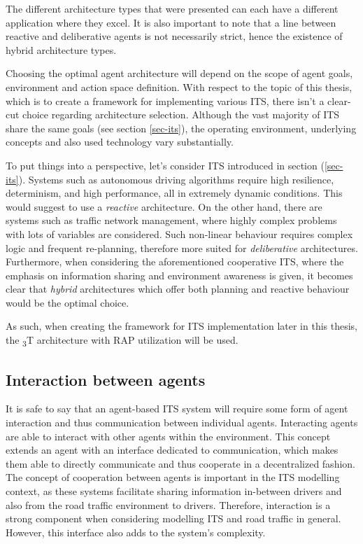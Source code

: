 \documentclass[main.tex]{subfiles}
\begin{document}
The different architecture types that were presented can each have a different application where 
they excel. It is also important to note that a line between reactive and deliberative agents 
is not necessarily strict, hence the existence of hybrid architecture types. 

Choosing the optimal agent architecture will depend on the scope of agent goals, 
environment and action space definition. With respect to the topic of this thesis, which is to 
create a framework for implementing various ITS, there isn't a clear-cut choice regarding 
architecture selection. Although the vast majority of ITS share the same goals (see section \ref{sec-its}), 
the operating environment, underlying concepts and also used technology vary substantially.

To put things into a perspective, let's consider ITS introduced in section (\ref{sec-its}). 
Systems such as autonomous driving algorithms require high resilience, determinism, 
and high performance, all in extremely dynamic conditions. This would suggest to use a
\emph{reactive} architecture. On the other hand, there are systems such as traffic network management, 
where highly complex problems with lots of variables are considered. Such non-linear behaviour 
requires complex logic and frequent re-planning, therefore more suited for \emph{deliberative}
architectures. Furthermore, when considering the aforementioned cooperative ITS, where the emphasis 
on information sharing and environment awareness is given, it becomes clear that \emph{hybrid} 
architectures which offer both planning and reactive behaviour would be the optimal choice.

As such, when creating the framework for ITS implementation later in this thesis, the
\textsubscript{3}T architecture with RAP utilization will be used.  

\subsection{Interaction between agents}\label{mas-interaction}

It is safe to say that an agent-based ITS system will require some form of agent interaction and
thus communication between individual agents. Interacting agents are able to interact with
other agents within the environment. This concept extends an agent with an interface dedicated
to communication, which makes them able to directly communicate and thus cooperate in a
decentralized fashion.  The concept of cooperation between agents is important in the ITS
modelling context, as these systems facilitate sharing information in-between drivers and also
from the road traffic environment to drivers. Therefore, interaction is a strong component when
considering modelling ITS and road traffic in general. However, this interface also adds to the
system's complexity.
\end{document}
